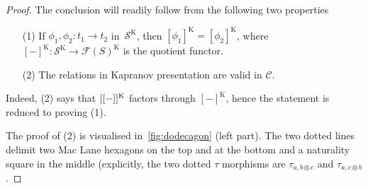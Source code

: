 \begin{proof}
The conclusion will readily follow from the following two properties
\begin{enumerate}
\item[(1)] If $\phi_1,\phi_2: t_1 \to t_2$ in~$\mathcal{S}^{\mathrm{K}}$, then $[\phi_1]^{\mathrm{K}}=[\phi_2]^{\mathrm{K}}$, where $[-]^{\mathrm{K}}:\mathcal{S}^{\mathrm{K}}\to  \mathcal{F}(S)^{\mathrm{K}}$ is the quotient functor.  
\item[(2)] The relations in Kapranov presentation are valid in $\mathcal C$.
\end{enumerate} 
Indeed, (2) says that $[[-]]^{\mathrm{K}}$ factors through $[-]^{\mathrm{K}}$, hence the statement is reduced to proving (1).

The proof of  (2) is visualised in~\cref{fig:dodecagon} (left part).  The two dotted lines delimit two Mac Lane hexagons on the top and at the bottom and a naturality square in the middle (explicitly, the two dotted $\tau$ morphisms are $\tau_{a,b\otimes c}$ and $\tau_{a,c\otimes b}$. 


\end{proof}
